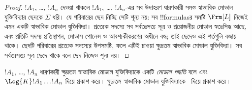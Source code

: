 \documentclass[../../../include/open-logic-section]{subfiles}
\begin{document}
\begin{proof}
  $!A_1$, \dots, $!A_n$ দেওয়া থাকলে $!A_1$, \dots, $!A_n$-এর সব উদাহরণ ধারণকারী সমস্ত স্বাভাবিক মোডাল যুক্তিবিদ্যার ছেদকে $\Sigma$ ধরি। যে পরিবারের ছেদ নিচ্ছি সেটি শূন্য নয়: সব !!{formula}sর সমষ্টি $\Frm[L]$ নিজেই এমন একটি স্বাভাবিক মোডাল যুক্তিবিদ্যা। প্রত্যেক সদস্যে সব সর্বতঃসত্য সূত্র ও প্রয়োজনীয় মোডাল স্বতঃসিদ্ধ আছে, এবং প্রতিটি সদস্য প্রতিস্থাপন, মোডাস পোনেন্স ও আবশ্যকীকরণের অধীনে বদ্ধ; তাই ছেদেও এই শর্তগুলি বজায় থাকে। ছেদটি পরিবারের প্রত্যেক সদস্যের উপসমষ্টি, ফলে এটিই চাওয়া ক্ষুদ্রতম স্বাভাবিক মোডাল যুক্তিবিদ্যা। সব সর্বতঃসত্য সূত্র ছেদে থাকে বলে ছেদ নিজেও শূন্য নয়।
\end{proof}

\begin{defn}
$!A_1$, \dots, $!A_n$ ধারণকারী ক্ষুদ্রতম স্বাভাবিক মোডাল যুক্তিবিদ্যাকে একটি \emph{মোডাল পদ্ধতি} বলে এবং $\Log{K} !A_1 \dots
!A_n$ দিয়ে প্রকাশ করে। ক্ষুদ্রতম স্বাভাবিক মোডাল যুক্তিবিদ্যাকে~ দিয়ে প্রকাশ করে।
\end{defn}
\end{document}
